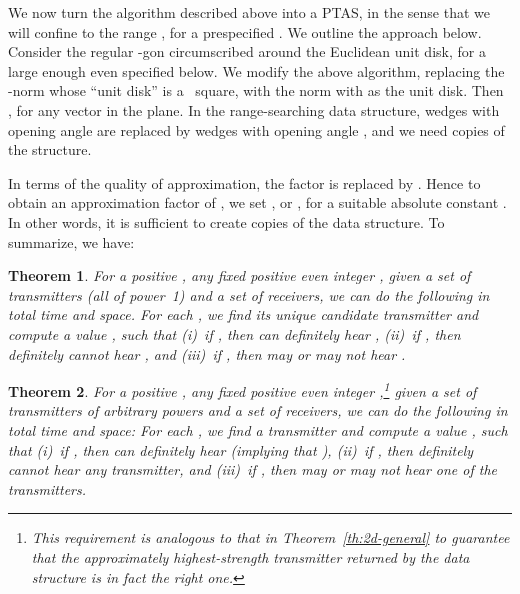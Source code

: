 \documentclass[11pt]{article}
\newtheorem{theorem}{Theorem}[section]
\theoremstyle{remark}
\begin{document}
We now turn the algorithm described above into a PTAS, in the sense that we will confine  to the range ,
for a prespecified .  We outline the approach below.
Consider the regular -gon  circumscribed around the Euclidean unit disk, for a large enough even  specified below.  We modify the above algorithm, replacing the -norm whose ``unit disk'' is a ~square, with the norm  with  as the unit disk. Then 
, for any vector  in the plane.  In the range-searching data structure, wedges with opening angle  are replaced by wedges with opening angle , and we need  copies of the structure.

In terms of the quality of approximation, the factor 
 is replaced by
. 
Hence to obtain an approximation factor of , we set
, or , for a suitable absolute constant .
In other words, it is sufficient to create  copies of the data structure.  To summarize, we have:

\begin{theorem}
  \label{th:2d-general-uniform-ptas}
  For a positive , any fixed positive even integer , given a set  of 
  transmitters (all of power~1) and a set  of  receivers, we can do the following in 
  total time  and  space.
For each , we find 
  its unique candidate transmitter  and compute a value , such that (i)~if ,
  then  can definitely hear , (ii)~if , then  definitely cannot hear , and 
  (iii)~if , then  may or may not hear .
\end{theorem}

\begin{theorem}
  \label{th:2d-general-ptas}
  For a positive , any fixed positive even integer ,\footnote{This requirement is analogous to that in Theorem~\ref{th:2d-general} to guarantee that the approximately highest-strength transmitter returned by the data structure is in fact the right one.}
  given a set  of 
  transmitters of arbitrary powers and a set  of  receivers, we can do the following in 
  total time  and  space: For each , we find 
  a transmitter  and compute a value , such that (i)~if ,
  then  can definitely hear  (implying that ), (ii)~if , then  definitely cannot hear any transmitter, and 
  (iii)~if , then  may or may not hear one of the transmitters.
\end{theorem}
\end{document}
